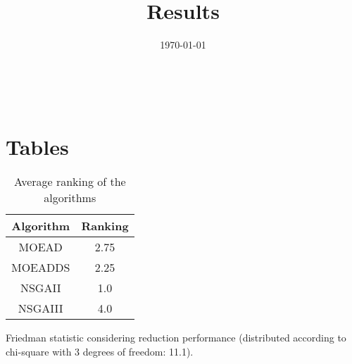 \documentclass{article}
\title{Results}
\author{}
\date{\today}
\begin{document}
\oddsidemargin 0in \topmargin 0in\maketitle
\
\section{Tables}
\begin{table}[!htp]
\centering
\caption{Average ranking of the algorithms}
\begin{tabular}{c|c}
Algorithm&Ranking\\
\hline
MOEAD&2.75\\
MOEADDS&2.25\\
NSGAII&1.0\\
NSGAIII&4.0\\
\end{tabular}
\end{table}


Friedman statistic considering reduction performance (distributed according to chi-square with 3 degrees of freedom: 11.1).
\end{document}

